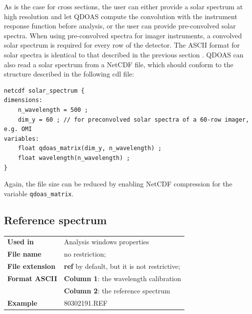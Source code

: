 As is the case for cross sections, the user can either provide a solar spectrum at high resolution and let QDOAS compute the convolution with the instrument response function before analysis, or the user can provide pre-convolved solar spectra.  When using pre-convolved spectra for imager instruments, a convolved solar spectrum is required for every row of the detector.  The ASCII format for solar spectra is identical to that described in the previous section .  QDOAS can also read a solar spectrum from a NetCDF file, which should conform to the structure described in the following cdl file:

\begin{Verbatim}[fontfamily=courier,fontsize=\relsize{-2}]
netcdf solar_spectrum {
dimensions:
	n_wavelength = 500 ;
	dim_y = 60 ; // for preconvolved solar spectra of a 60-row imager, e.g. OMI
variables:
	float qdoas_matrix(dim_y, n_wavelength) ;
	float wavelength(n_wavelength) ;
}
\end{Verbatim}

Again, the file size can be reduced by enabling NetCDF compression for the variable \texttt{qdoas\_matrix}.

\subsection{Reference spectrum}\hfill
\begin{minipage}[t]{\textwidth}
\vspace{-0.6\baselineskip}
\begin{tabular}[h]{l p{8cm}}
\textbf{Used in} & Analysis windows properties \\ [6pt]
\textbf{File name} & no restriction;  \\ [6pt]
\textbf{File extension} & \textbf{ref} by default, but it is not restrictive; \\ [6pt]
\textbf{Format ASCII} & \textbf{Column 1}: the wavelength calibration \\
                      & \textbf{Column 2}: the reference spectrum \\ [6pt]
\textbf{Example} & 80302191.REF
\end{tabular}
\end{minipage}

